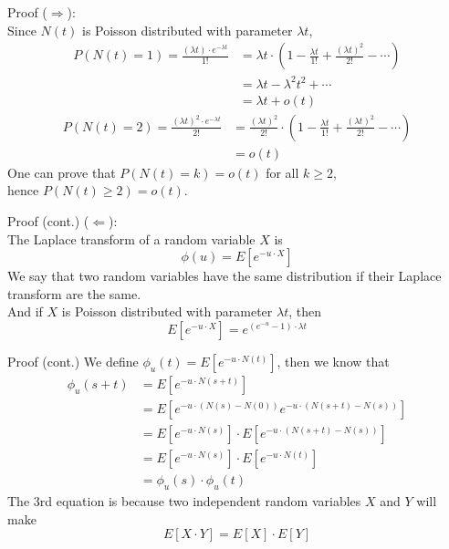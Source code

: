 \documentclass[mathserif]{beamer}
\begin{document}
\begin{frame}{Proof}
($\Longrightarrow$):\\
Since $N(t)$ is Poisson distributed with parameter $\lambda t$,
\begin{align*}
P(N(t)=1) = \frac{(\lambda t)\cdot e^{-\lambda t}}{1!} & = \lambda t 
	\cdot\left(1 - \frac{\lambda t}{1!} + \frac{(\lambda t)^2}{2!} - \cdots\right) \\
& = \lambda t - {\lambda}^2 t^2 + \cdots \\
& = \lambda t + o(t)
\end{align*}
\begin{align*}
P(N(t)=2) = \frac{(\lambda t)^2\cdot e^{-\lambda t}}{2!} & = \frac{(\lambda t)^2}{2!}
	\cdot\left(1 - \frac{\lambda t}{1!} + \frac{(\lambda t)^2}{2!} - \cdots\right) \\
& = o(t)
\end{align*}
One can prove that $P(N(t) = k) = o(t)$ for all $k \geq 2$,\\
hence $P(N(t)\geq 2) = o(t)$.
\end{frame}

\begin{frame}{Proof (cont.)}
($\Longleftarrow$):\\
The Laplace transform of a random variable $X$ is
\[
\phi(u) = E[e^{-u\cdot X}]
\]
We say that two random variables have the same distribution if their Laplace transform are the same.\\
And if $X$ is Poisson distributed with parameter $\lambda t$, then
\[
E[e^{-u\cdot X}] = e^{(e^{-u} - 1)\cdot \lambda t}
\]
\end{frame}

\begin{frame}{Proof (cont.)}
We define $\phi_u(t) = E[e^{-u\cdot N(t)}]$, then we know that
\begin{align*}
\phi_u(s+t) & = E[e^{-u\cdot N(s+t)}] \\
& = E[e^{-u\cdot(N(s)-N(0))} e^{-u\cdot(N(s+t)-N(s))}] \\
& = E[e^{-u\cdot N(s)}]\cdot E[e^{-u\cdot (N(s+t) - N(s))}] \\
& = E[e^{-u\cdot N(s)}]\cdot E[e^{-u\cdot N(t)}] \\
& = \phi_u(s)\cdot \phi_u(t)
\end{align*}
The 3rd equation is because two independent random variables $X$ and $Y$ will make
\[
E[X\cdot Y] = E[X]\cdot E[Y]
\]
\end{frame}
\end{document}
